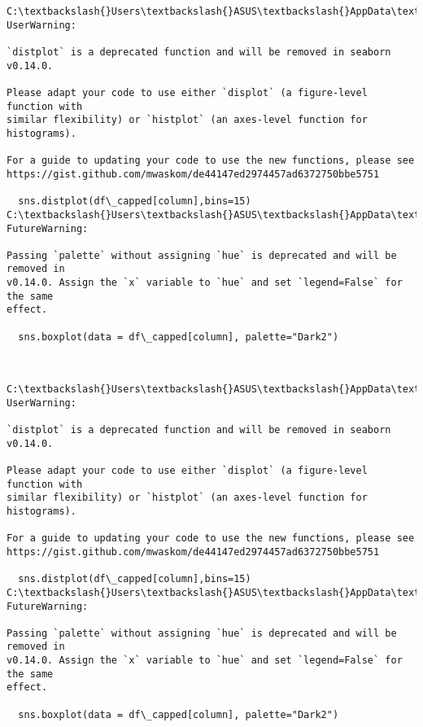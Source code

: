 \documentclass[11pt]{article}
\begin{document}
    \begin{Verbatim}[commandchars=\\\{\}]
C:\textbackslash{}Users\textbackslash{}ASUS\textbackslash{}AppData\textbackslash{}Local\textbackslash{}Temp\textbackslash{}ipykernel\_1856\textbackslash{}3437602839.py:5: UserWarning:

`distplot` is a deprecated function and will be removed in seaborn v0.14.0.

Please adapt your code to use either `displot` (a figure-level function with
similar flexibility) or `histplot` (an axes-level function for histograms).

For a guide to updating your code to use the new functions, please see
https://gist.github.com/mwaskom/de44147ed2974457ad6372750bbe5751

  sns.distplot(df\_capped[column],bins=15)
C:\textbackslash{}Users\textbackslash{}ASUS\textbackslash{}AppData\textbackslash{}Local\textbackslash{}Temp\textbackslash{}ipykernel\_1856\textbackslash{}3437602839.py:8: FutureWarning:

Passing `palette` without assigning `hue` is deprecated and will be removed in
v0.14.0. Assign the `x` variable to `hue` and set `legend=False` for the same
effect.

  sns.boxplot(data = df\_capped[column], palette="Dark2")
    \end{Verbatim}

    \begin{center}
    \end{center}
    { \hspace*{\fill} \\}
    
    \begin{Verbatim}[commandchars=\\\{\}]
C:\textbackslash{}Users\textbackslash{}ASUS\textbackslash{}AppData\textbackslash{}Local\textbackslash{}Temp\textbackslash{}ipykernel\_1856\textbackslash{}3437602839.py:5: UserWarning:

`distplot` is a deprecated function and will be removed in seaborn v0.14.0.

Please adapt your code to use either `displot` (a figure-level function with
similar flexibility) or `histplot` (an axes-level function for histograms).

For a guide to updating your code to use the new functions, please see
https://gist.github.com/mwaskom/de44147ed2974457ad6372750bbe5751

  sns.distplot(df\_capped[column],bins=15)
C:\textbackslash{}Users\textbackslash{}ASUS\textbackslash{}AppData\textbackslash{}Local\textbackslash{}Temp\textbackslash{}ipykernel\_1856\textbackslash{}3437602839.py:8: FutureWarning:

Passing `palette` without assigning `hue` is deprecated and will be removed in
v0.14.0. Assign the `x` variable to `hue` and set `legend=False` for the same
effect.

  sns.boxplot(data = df\_capped[column], palette="Dark2")
    \end{Verbatim}
\end{document}
